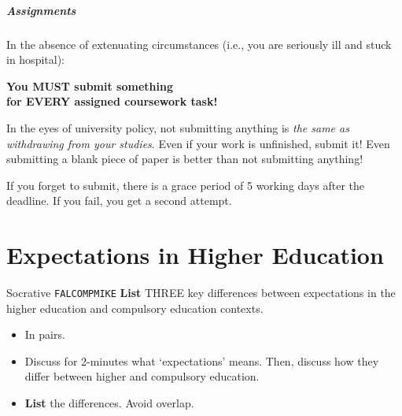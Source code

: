 \begin{frame}
	\frametitle{Assignments}
		
	In the absence of extenuating circumstances (i.e., you are seriously ill and stuck in hospital):
	
	\begin{Large}
		\begin{center}
			\textbf{You MUST submit something \\ for EVERY assigned coursework task!}
		\end{center}
	\end{Large}
	
	In the eyes of university policy, not submitting anything is \textit{the same as withdrawing from your studies}. Even if your work is unfinished, submit it! Even submitting a blank piece of paper is better than not submitting anything! 
	
		\vspace{0.5em}
	
	If you forget to submit, there is a grace period of 5 working days after the deadline. If you fail, you get a second attempt.
	
\end{frame}


\part{Expectations in Higher Education}
\frame{\partpage}

\begin{frame}{Socrative \texttt{FALCOMPMIKE}}
	\textbf{List} THREE key differences between expectations in the higher education and compulsory education contexts.
	
	\begin{itemize}
		\item In pairs.
		\item Discuss for 2-minutes what `expectations' means. Then, discuss how they differ between higher and compulsory education.
		\item \textbf{List} the differences. Avoid overlap.
	\end{itemize}
\end{frame}

